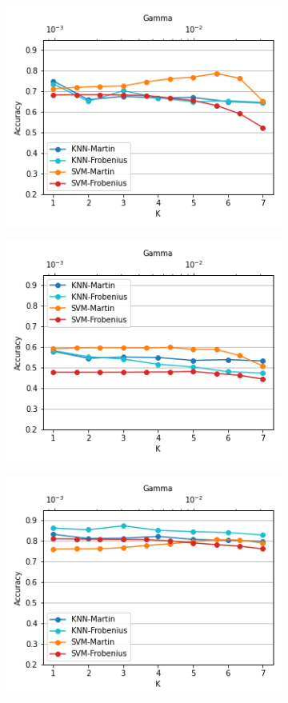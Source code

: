 \documentclass[twocolumn,10pt]{asme2ej}
\begin{document}
\begin{figure}[t]
    \centering
    \begin{subfigure}{0.25\paperwidth}
      \centering
      \includegraphics[width=0.25\paperwidth]{evaluation_jigsaws_accuracy_baseline_Knot_Tying.png}
    \end{subfigure}%
    \begin{subfigure}{0.25\paperwidth}
      \centering
      \includegraphics[width=0.25\paperwidth]{evaluation_jigsaws_accuracy_baseline_Needle_Passing.png}
    \end{subfigure}%
    \begin{subfigure}{0.25\paperwidth}
      \centering
      \includegraphics[width=0.25\paperwidth]{evaluation_jigsaws_accuracy_baseline_Suturing.png}

\end{subfigure}
\end{figure}
\end{document}
